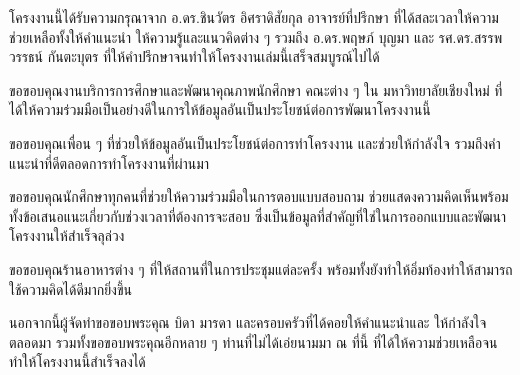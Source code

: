 \begin{acknowledgments}
โครงงานนี้ได้รับความกรุณาจาก อ.ดร.ชินวัตร อิศราดิสัยกุล อาจารย์ที่ปรึกษา ที่ได้สละเวลาให้ความช่วยเหลือทั้งให้คำแนะนำ ให้ความรู้และแนวคิดต่าง ๆ รวมถึง อ.ดร.พฤษภ์ บุญมา และ รศ.ดร.สรรพวรรธน์ กันตะบุตร ที่ให้คำปรึกษาจนทำให้โครงงานเล่มนี้เสร็จสมบูรณ์ไปได้
    
ขอขอบคุณงานบริการการศึกษาและพัฒนาคุณภาพนักศึกษา คณะต่าง ๆ ใน มหาวิทยาลัยเชียงใหม่ ที่ได้ให้ความร่วมมือเป็นอย่างดีในการให้ข้อมูลอันเป็นประโยชน์ต่อการพัฒนาโครงงานนี้

ขอขอบคุณเพื่อน ๆ ที่ช่วยให้ข้อมูลอันเป็นประโยชน์ต่อการทำโครงงาน และช่วยให้กำลังใจ รวมถึงคำแนะนำที่ดีตลอดการทำโครงงานที่ผ่านมา

ขอขอบคุณนักศึกษาทุกคนที่ช่วยให้ความร่วมมือในการตอบแบบสอบถาม ช่วยแสดงความคิดเห็นพร้อมทั้งข้อเสนอแนะเกี่ยวกับช่วงเวลาที่ต้องการจะสอบ ซึ่งเป็นข้อมูลที่สำคัญที่ใช่ในการออกแบบและพัฒนาโครงงานให้สำเร็จลุล่วง

ขอขอบคุณร้านอาหารต่าง ๆ ที่ให้สถานที่ในการประชุมแต่ละครั้ง พร้อมทั้งยังทำให้อิ่มท้องทำให้สามารถใช้ความคิดได้ดีมากยิ่งขึ้น

นอกจากนี้ผู้จัดทำขอขอบพระคุณ บิดา มารดา และครอบครัวที่ได้คอยให้คำแนะนำและ ให้กำลังใจ ตลอดมา รวมทั้งขอขอบพระคุณอีกหลาย ๆ ท่านที่ไม่ได้เอ่ยนามมา ณ ที่นี้ ที่ได้ให้ความช่วยเหลือจนทำให้โครงงานนี้สำเร็จลงได้ 


\end{acknowledgments}%
\fi %

\contentspage

\ifproject
\figurelistpage

\tablelistpage
\fi %



